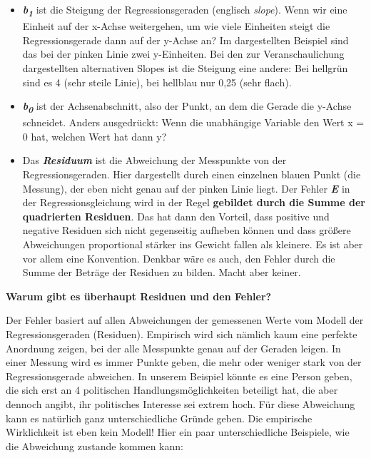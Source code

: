 \documentclass[
]{book}
\begin{document}
\begin{itemize}
\item
  \textbf{\emph{b\textsubscript{1}}} ist die Steigung der Regressionsgeraden (englisch \emph{slope}). Wenn wir eine Einheit auf der x-Achse weitergehen, um wie viele Einheiten steigt die Regressionsgerade dann auf der y-Achse an? Im dargestellten Beispiel sind das bei der pinken Linie zwei y-Einheiten. Bei den zur Veranschaulichung dargestellten alternativen Slopes ist die Steigung eine andere: Bei hellgrün sind es 4 (sehr steile Linie), bei hellblau nur 0,25 (sehr flach).
\item
  \textbf{\emph{b\textsubscript{0}}} ist der Achsenabschnitt, also der Punkt, an dem die Gerade die y-Achse schneidet. Anders ausgedrückt: Wenn die unabhängige Variable den Wert x = 0 hat, welchen Wert hat dann y?
\item
  Das \textbf{\emph{Residuum}} ist die Abweichung der Messpunkte von der Regressionsgeraden. Hier dargestellt durch einen einzelnen blauen Punkt (die Messung), der eben nicht genau auf der pinken Linie liegt. Der Fehler \textbf{\emph{E}} in der Regressionsgleichung wird in der Regel \textbf{gebildet durch die Summe der quadrierten Residuen}. Das hat dann den Vorteil, dass positive und negative Residuen sich nicht gegenseitig aufheben können und dass größere Abweichungen proportional stärker ins Gewicht fallen als kleinere. Es ist aber vor allem eine Konvention. Denkbar wäre es auch, den Fehler durch die Summe der Beträge der Residuen zu bilden. Macht aber keiner.
\end{itemize}

\leavevmode\hypertarget{info_e}{}%
\textbf{Warum gibt es überhaupt Residuen und den Fehler?}

Der Fehler basiert auf allen Abweichungen der gemessenen Werte vom Modell der Regressionsgeraden (Residuen). Empirisch wird sich nämlich kaum eine perfekte Anordnung zeigen, bei der alle Messpunkte genau auf der Geraden leigen. In einer Messung wird es immer Punkte geben, die mehr oder weniger stark von der Regressionsgerade abweichen. In unserem Beispiel könnte es eine Person geben, die sich erst an 4 politischen Handlungsmöglichkeiten beteiligt hat, die aber dennoch angibt, ihr politisches Interesse sei extrem hoch. Für diese Abweichung kann es natürlich ganz unterschiedliche Gründe geben. Die empirische Wirklichkeit ist eben kein Modell! Hier ein paar unterschiedliche Beispiele, wie die Abweichung zustande kommen kann:
\end{document}
